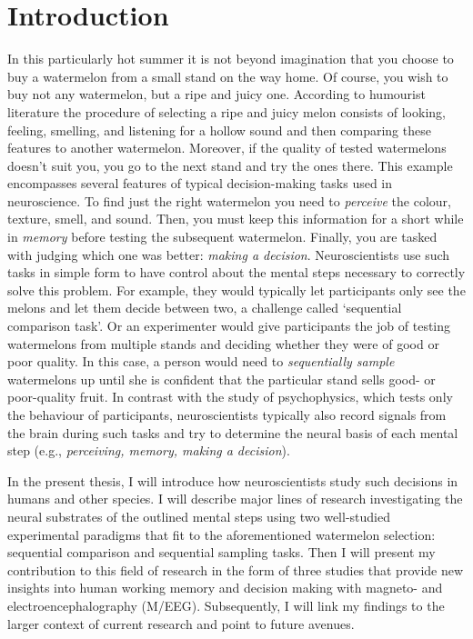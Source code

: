 
\chapter{Introduction}

\label{ch:Introduction}
In this particularly hot summer it is not beyond imagination that you choose to buy a watermelon from a small stand on the way home. Of course, you wish to buy not any watermelon, but a ripe and juicy one. According to humourist literature \parencite["fixating the melon's secret",][]{Kishon1975} the procedure of selecting a ripe and juicy melon consists of looking, feeling, smelling, and listening for a hollow sound and then comparing these features to another watermelon. Moreover, if the quality of tested watermelons doesn’t suit you, you go to the next stand and try the ones there. This example encompasses several features of typical decision-making tasks used in neuroscience. To find just the right watermelon you need to \textit{perceive} the colour, texture, smell, and sound. Then, you must keep this information for a short while in \textit{memory} before testing the subsequent watermelon. Finally, you are tasked with judging which one was better: \textit{making a decision}. Neuroscientists use such tasks in simple form to have control about the mental steps necessary to correctly solve this problem. For example, they would typically let participants only see the melons and let them decide between two, a challenge called ‘sequential comparison task’. Or an experimenter would give participants the job of testing watermelons from multiple stands and deciding whether they were of good or poor quality. In this case, a person would need to \textit{sequentially sample} watermelons up until she is confident that the particular stand sells good- or poor-quality fruit. In contrast with the study of psychophysics, which tests only the behaviour of participants, neuroscientists typically also record signals from the brain during such tasks and try to determine the neural basis of each mental step (e.g., \textit{perceiving, memory, making a decision}). 

In the present thesis, I will introduce how neuroscientists study such decisions in humans and other species. I will describe major lines of research investigating the neural substrates of the outlined mental steps using two well-studied experimental paradigms that fit to the aforementioned watermelon selection: sequential comparison and sequential sampling tasks. Then I will present my contribution to this field of research in the form of three studies that provide new insights into human working memory and decision making with magneto- and electroencephalography (M/EEG). Subsequently, I will link my findings to the larger context of current research and point to future avenues. 

